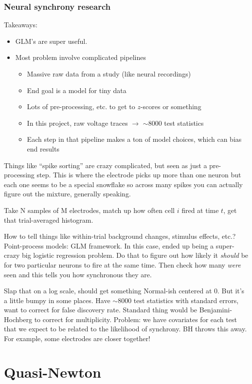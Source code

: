 \documentclass{article}
\begin{document}
\subsubsection{Neural synchrony research}
Takeaways:
\begin{itemize}
	\item GLM's are super useful.
	\item Most problem involve complicated pipelines
	\begin{itemize}
		\item Massive raw data from a study (like neural recordings)
		\item End goal is a model for tiny data
		\item Lots of pre-processing, etc. to get to $z$-scores or something
		\item In this project, raw voltage traces $\rightarrow$ $\sim$8000 test statistics
		\item Each step in that pipeline makes a ton of model choices, which can bias end results
	\end{itemize}
\end{itemize}

Things like ``spike sorting'' are crazy complicated, but seen as just a pre-processing step. This is where the electrode picks up
more than one neuron but each one seems to be a special snowflake so across many spikes you can actually
figure out the mixture, generally speaking.

Take N samples of M electrodes, match up how often cell $i$ fired at time $t$, get that trial-averaged histogram.

How to tell things like within-trial background changes, stimulus effects, etc.? Point-process models: GLM framework. In this case,
ended up being a super-crazy big logistic regression problem. Do that to figure out how likely it \emph{should} be for two particular
neurons to fire at the same time. Then check how many \emph{were} seen and this tells you how synchronous they are.

Slap that on a log scale, should get something Normal-ish centered at 0. But it's a little bumpy in some places. Have $\sim$8000 test
statistics with standard errors, want to correct for false discovery rate. Standard thing would be Benjamini-Hochberg to correct
for multiplicity. Problem: we have covariates for each test that we expect to be related to the likelihood of synchrony. BH throws
this away. For example, some electrodes are closer together!

\section{Quasi-Newton}
\end{document}
